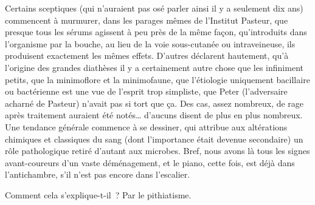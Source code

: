 \documentclass[french,twoside]{book} %
\begin{document}
Certains sceptiques (qui n’auraient pas osé parler ainsi il y a seulement dix ans) commencent à murmurer, dans les parages mêmes de l’Institut Pasteur, que presque tous les sérums agissent à peu près de la même façon, qu’introduits dans l’organisme par la bouche, au lieu de la voie sous-cutanée ou intraveineuse, ils produisent exactement les mêmes effets. D’autres déclarent hautement, qu’à l’origine des grandes diathèses il y a certainement autre chose que les infiniment petits, que la minimoflore et la minimofaune, que l’étiologie uniquement bacillaire ou bactérienne est une vue de l’esprit trop simpliste, que Peter (l’adversaire acharné de Pasteur) n’avait pas si tort que ça. Des cas, assez nombreux, de rage après traitement auraient été notés… d’aucuns disent de plus en plus nombreux. Une tendance générale commence à se dessiner, qui attribue aux altérations chimiques et classiques du sang (dont l’importance était devenue secondaire) un rôle pathologique retiré d’autant aux microbes. Bref, nous avons là tous les signes avant-coureurs d’un vaste déménagement, et le piano, cette fois, est déjà dans l’antichambre, s’il n’est pas encore dans l’escalier.\par
Comment cela s’explique-t-il ? Par le pithiatisme.\par
\end{document}

